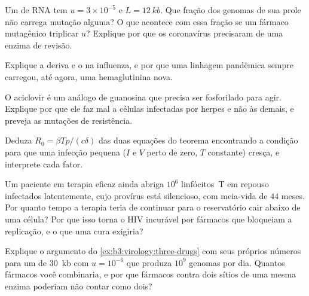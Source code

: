 \begin{exercise}[$\star\star$]\label{exo:b3:virology:7}
Um  de RNA tem $u = 3\times 10^{-5}$ e $L = \qty{12}{kb}$. Que
fração dos genomas de sua prole não carrega mutação alguma? O que
acontece com essa fração se um fármaco mutagênico triplicar $u$?
Explique por que os coronavírus precisaram de uma enzima de revisão.
\end{exercise}

\begin{exercise}[$\star\star$]\label{exo:b3:virology:8}
Explique a deriva e o  na influenza, e por que uma
linhagem pandêmica sempre carregou, até agora, uma hemaglutinina nova.
\end{exercise}

\begin{exercise}[$\star\star$]\label{exo:b3:virology:9}
O aciclovir é um análogo de guanosina que precisa ser fosforilado para
agir. Explique por que ele faz mal a células infectadas por herpes e
não às demais, e preveja as mutações de resistência.
\end{exercise}

\begin{exercise}[$\star\star\star$]\label{exo:b3:virology:10}
Deduza $R_{0} = \beta Tp/(c\delta)$ das duas equações do teorema
encontrando a condição para que uma infecção pequena ($I$ e $V$ perto
de zero, $T$ constante) cresça, e interprete cada fator.
\end{exercise}

\begin{exercise}[$\star\star\star$]\label{exo:b3:virology:11}
Um paciente em terapia eficaz ainda abriga $10^{6}$ linfócitos~T em
repouso infectados latentemente, cujo provírus está silencioso, com
meia-vida de $44$ meses. Por quanto tempo a terapia teria de continuar
para o reservatório cair abaixo de uma célula? Por que isso torna o HIV
incurável por fármacos que bloqueiam a replicação, e o que uma cura
exigiria?
\end{exercise}

\begin{exercise}[$\star\star\star$]\label{exo:b3:virology:12}
Explique o argumento do \cref{ex:b3:virology:three-drugs} com seus
próprios números para um  de \qty{30}{kb} com $u = 10^{-6}$ que
produza $10^{9}$ genomas por dia. Quantos fármacos você combinaria, e
por que fármacos contra dois sítios de uma mesma enzima poderiam não
contar como dois?
\end{exercise}


